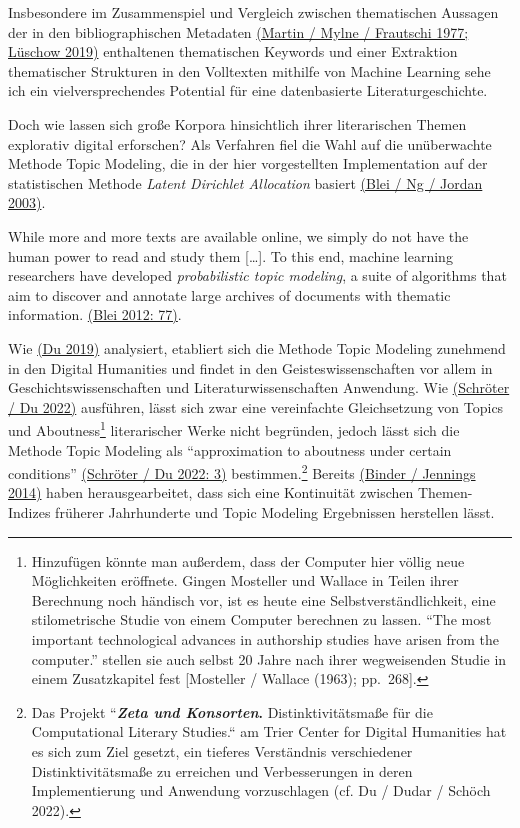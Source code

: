 \documentclass[
  12pt,
  letterpaper,
  DIV=11,
  numbers=noendperiod]{scrreprt}
\begin{document}
Insbesondere im Zusammenspiel und Vergleich zwischen thematischen
Aussagen der in den bibliographischen Metadaten
\href{https://www.zotero.org/google-docs/?4b66LI}{(Martin / Mylne /
Frautschi 1977; Lüschow 2019)} enthaltenen thematischen Keywords und
einer Extraktion thematischer Strukturen in den Volltexten mithilfe von
Machine Learning sehe ich ein vielversprechendes Potential für eine
datenbasierte Literaturgeschichte.

Doch wie lassen sich große Korpora hinsichtlich ihrer literarischen
Themen explorativ digital erforschen? Als Verfahren fiel die Wahl auf
die unüberwachte Methode Topic Modeling, die in der hier vorgestellten
Implementation auf der statistischen Methode \emph{Latent Dirichlet
Allocation} basiert
\href{https://www.zotero.org/google-docs/?1VIPBG}{(Blei / Ng / Jordan
2003)}.

While more and more texts are available online, we simply do not have
the human power to read and study them {[}\ldots{]}. To this end,
machine learning researchers have developed \emph{probabilistic topic
modeling}, a suite of algorithms that aim to discover and annotate large
archives of documents with thematic information.
\href{https://www.zotero.org/google-docs/?N5U3aL}{(Blei 2012: 77)}.

Wie \href{https://www.zotero.org/google-docs/?24S4Di}{(Du 2019)}
analysiert, etabliert sich die Methode Topic Modeling zunehmend in den
Digital Humanities und findet in den Geisteswissenschaften vor allem in
Geschichtswissenschaften und Literaturwissenschaften Anwendung. Wie
\href{https://www.zotero.org/google-docs/?fOxUUn}{(Schröter / Du 2022)}
ausführen, lässt sich zwar eine vereinfachte Gleichsetzung von Topics
und Aboutness\footnote{Hinzufügen könnte man außerdem, dass der Computer
  hier völlig neue Möglichkeiten eröffnete. Gingen Mosteller und Wallace
  in Teilen ihrer Berechnung noch händisch vor, ist es heute eine
  Selbstverständlichkeit, eine stilometrische Studie von einem Computer
  berechnen zu lassen. ``The most important technological advances in
  authorship studies have arisen from the computer.'' stellen sie auch
  selbst 20 Jahre nach ihrer wegweisenden Studie in einem Zusatzkapitel
  fest {[}Mosteller / Wallace (1963); pp.~268{]}.} literarischer Werke
nicht begründen, jedoch lässt sich die Methode Topic Modeling als
``approximation to aboutness under certain conditions''
\href{https://www.zotero.org/google-docs/?1IOP8S}{(Schröter / Du 2022:
3)} bestimmen.\footnote{Das Projekt ``\textbf{\emph{Zeta und
  Konsorten}.} Distinktivitätsmaße für die Computational Literary
  Studies.`` am Trier Center for Digital Humanities hat es sich zum Ziel
  gesetzt, ein tieferes Verständnis verschiedener Distinktivitätsmaße zu
  erreichen und Verbesserungen in deren Implementierung und Anwendung
  vorzuschlagen (cf. Du / Dudar / Schöch 2022).} Bereits
\href{https://www.zotero.org/google-docs/?Nlq5WF}{(Binder / Jennings
2014)} haben herausgearbeitet, dass sich eine Kontinuität zwischen
Themen-Indizes früherer Jahrhunderte und Topic Modeling Ergebnissen
herstellen lässt.
\end{document}
